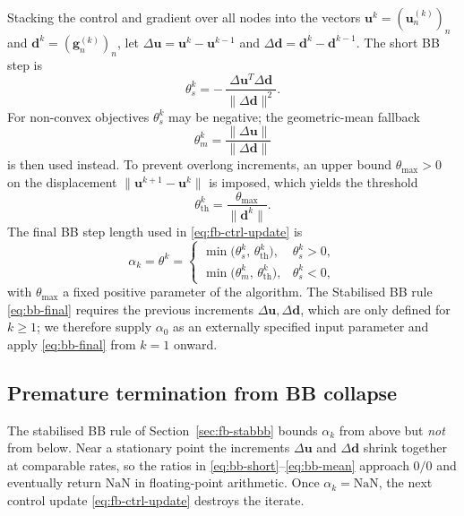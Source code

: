 \documentclass[a4paper, 10pt]{article}
\begin{document}
Stacking the control and gradient over all nodes into the vectors
$\bm{u}^{k} = (\bm{u}_n^{(k)})_n$ and $\bm{d}^{k} = (\bm{g}_n^{(k)})_n$,
let $\Delta\bm{u} = \bm{u}^{k} - \bm{u}^{k-1}$ and
$\Delta\bm{d} = \bm{d}^{k} - \bm{d}^{k-1}$. The short BB step is
\begin{equation}
    \theta_s^{k} = -\,\frac{\Delta\bm{u}^{T}\Delta\bm{d}}{\|\Delta\bm{d}\|^{2}}.
    \label{eq:bb-short}
\end{equation}
For non-convex objectives $\theta_s^{k}$ may be negative; the geometric-mean
fallback
\begin{equation}
    \theta_m^{k} = \frac{\|\Delta\bm{u}\|}{\|\Delta\bm{d}\|}
    \label{eq:bb-mean}
\end{equation}
is then used instead. To prevent overlong increments, an upper bound
$\theta_{\max} > 0$ on the displacement $\|\bm{u}^{k+1}-\bm{u}^{k}\|$ is
imposed, which yields the threshold
\begin{equation}
    \theta_{\mathrm{th}}^{k} = \frac{\theta_{\max}}{\|\bm{d}^{k}\|}.
    \label{eq:bb-thresh}
\end{equation}
The final BB step length used in \eqref{eq:fb-ctrl-update} is
\begin{equation}
    \alpha_k = \theta^{k} =
    \begin{cases}
        \min\bigl(\theta_s^{k},\,\theta_{\mathrm{th}}^{k}\bigr), & \theta_s^{k} > 0, \\
        \min\bigl(\theta_m^{k},\,\theta_{\mathrm{th}}^{k}\bigr), & \theta_s^{k} < 0,
    \end{cases}
    \label{eq:bb-final}
\end{equation}
with $\theta_{\max}$ a fixed positive parameter of the algorithm. The
Stabilised BB rule \eqref{eq:bb-final} requires the previous increments
$\Delta\bm{u}, \Delta\bm{d}$, which are only defined for $k \geq 1$; we
therefore supply $\alpha_0$ as an externally specified input parameter
and apply \eqref{eq:bb-final} from $k = 1$ onward.

\subsection{Premature termination from BB collapse}
\label{sec:fb-collapse}

The stabilised BB rule of Section~\ref{sec:fb-stabbb} bounds $\alpha_k$
from above but \emph{not} from below. Near a stationary point the
increments $\Delta\bm{u}$ and $\Delta\bm{d}$ shrink together at comparable
rates, so the ratios in \eqref{eq:bb-short}--\eqref{eq:bb-mean} approach
$0/0$ and eventually return $\mathrm{NaN}$ in floating-point arithmetic.
Once $\alpha_k = \mathrm{NaN}$, the next control update
\eqref{eq:fb-ctrl-update} destroys the iterate.
\end{document}
